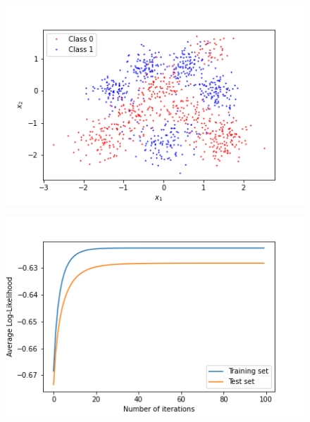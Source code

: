 \documentclass[a4paper]{article}
\begin{document}
    \begin{figure}
        \begin{minipage}{0.32\textwidth}
            \centering
            \includegraphics[width=\textwidth]{plots/ml_logistic_classification/data}
            \label{fig:data}
        \end{minipage}%
        \begin{minipage}{0.32\textwidth}
            \centering
            \includegraphics[width=\textwidth]{plots/ml_logistic_classification/log_likelihood}
            \label{fig:linear_log_likelihood}
        \end{minipage}%
        \begin{minipage}{0.32\textwidth}

\end{minipage}
\end{figure}
\end{document}

